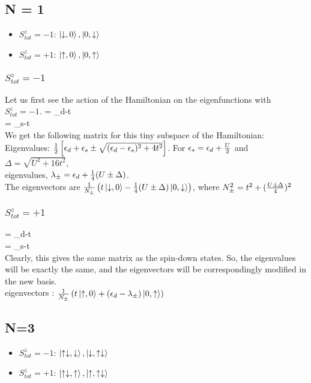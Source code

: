 \documentclass[12pt]{article}
\begin{document}
\subsection{N = 1}
\begin{itemize}
\item \(S_{tot}^z = -1\): \(\ket{\downarrow,0}, \ket{0, \downarrow}\)
\item \(S_{tot}^z = +1\): \(\ket{\uparrow,0}, \ket{0, \uparrow}\)
\end{itemize}
\subsubsection{\(S_{tot}^z = -1\)}
Let us first see the action of the Hamiltonian on the eigenfunctions with \(S_{tot}^z = -1\).
\beq
\ham{} = \epsilon_d-t \\
\ham{} = \epsilon_s-t \\
\eeq
We get the following matrix for this tiny subspace of the Hamiltonian:
\beq
{}
\eeq
Eigenvalues: \(\frac{1}{2}\left[{\epsilon_d+\epsilon_s \pm \sqrt{(\epsilon_d-\epsilon_s)^2+4t^2}}\right]\). For \(\epsilon_s = \epsilon_d + \frac{U}{2}\) and \(\Delta = \sqrt{U^2+16t^2}\), \\ eigenvalues, \(\lambda_\pm = \epsilon_d + \frac{1}{4}(U\pm\Delta)\). \\
The eigenvectors are \(\frac{1}{N_\pm}\left({t\ket{\downarrow,0}-\frac{1}{4}(U\pm\Delta)\ket{0,\downarrow}}\right)\), where \(N_\pm^2 = t^2 + (\frac{U\pm\Delta}{4})^2\)
\subsubsection{\(S_{tot}^z = +1\)}
\beq
\ham{} = \epsilon_d-t \\
\ham{} = \epsilon_s-t \\
\eeq
Clearly, this gives the same matrix as the spin-down states. So, the eigenvalues will be exactly the same, and the eigenvectors will be correspondingly modified in the new basis. \\
eigenvectors : \(\frac{1}{N_\pm}\left({t\ket{\uparrow,0}+(\epsilon_d-\lambda_\pm)\ket{0,\uparrow}}\right)\)
\subsection{N=3}
\begin{itemize}
\item \(S_{tot}^z = -1\): \(\ket{\uparrow\downarrow,\downarrow}, \ket{\downarrow,\uparrow\downarrow}\)
\item \(S_{tot}^z = +1\): \(\ket{\uparrow\downarrow,\uparrow}, \ket{\uparrow,\uparrow\downarrow}\)
\end{itemize}
\end{document}
